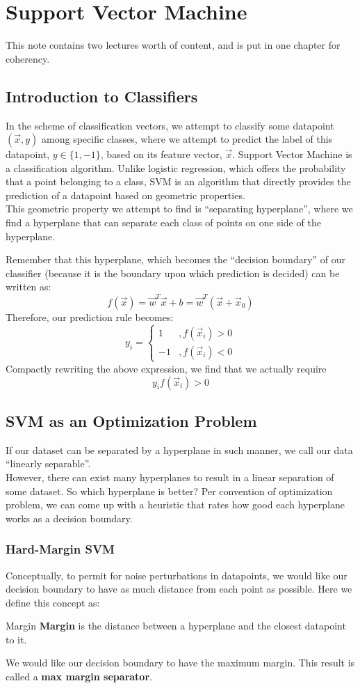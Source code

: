 \chapter{Support Vector Machine}
This note contains two lectures worth of content, and is put in one chapter for coherency.

\section{Introduction to Classifiers}
In the scheme of classification vectors, we attempt to classify some datapoint $(\vec{x}, y)$ among specific classes, where we attempt to predict the label of this datapoint, $y \in \{1, -1\}$, based on its feature vector, $\vec{x}$.
Support Vector Machine is a classification algorithm.
Unlike logistic regression, which offers the probability that a point belonging to a class, SVM is an algorithm that directly provides the prediction of a datapoint based on geometric properties. \\
This geometric property we attempt to find is ``separating hyperplane'', where we find a hyperplane that can separate each class of points on one side of the hyperplane.

Remember that this hyperplane, which becomes the ``decision boundary'' of our classifier (because it is the boundary upon which prediction is decided) can be written as:
\[
    f(\vec{x}) = \vec{w}^T \vec{x} + b = \vec{w}^T (\vec{x} + \vec{x}_0)
\]
Therefore, our prediction rule becomes:
\[
    y_i = \begin{cases}
        1 &, f(\vec{x}_i) > 0 \\
        -1 &, f(\vec{x}_i) < 0
    \end{cases}
\]
Compactly rewriting the above expression, we find that we actually require
\[
    y_i f(\vec{x}_i) > 0
\]

\section{SVM as an Optimization Problem}
If our dataset can be separated by a hyperplane in such manner, we call our data ``linearly separable''. \\
However, there can exist many hyperplanes to result in a linear separation of some dataset.
So which hyperplane is better?
Per convention of optimization problem, we can come up with a heuristic that rates how good each hyperplane works as a decision boundary.

\subsection{Hard-Margin SVM}
Conceptually, to permit for noise perturbations in datapoints, we would like our decision boundary to have as much distance from each point as possible.
Here we define this concept as:
\begin{ln-define}{Margin}{}
    \textbf{Margin} is the distance between a hyperplane and the closest datapoint to it.
\end{ln-define}
We would like our decision boundary to have the maximum margin. This result is called a \textbf{max margin separator}.

